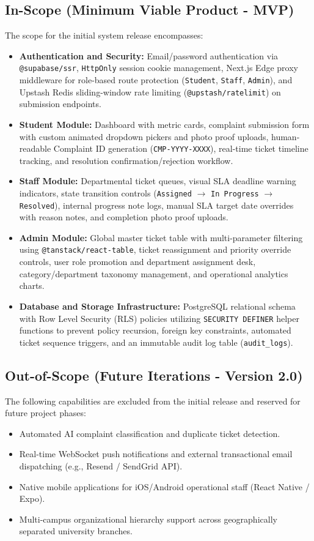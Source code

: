 \documentclass[12pt, a4paper]{article}
\begin{document}
\subsection{In-Scope (Minimum Viable Product - MVP)}
The scope for the initial system release encompasses:

\begin{itemize}
    \item \textbf{Authentication and Security:} Email/password authentication via \texttt{@supabase/ssr}, \texttt{HttpOnly} session cookie management, Next.js Edge proxy middleware for role-based route protection (\texttt{Student}, \texttt{Staff}, \texttt{Admin}), and Upstash Redis sliding-window rate limiting (\texttt{@upstash/ratelimit}) on submission endpoints.
    \item \textbf{Student Module:} Dashboard with metric cards, complaint submission form with custom animated dropdown pickers and photo proof uploads, human-readable Complaint ID generation (\texttt{CMP-YYYY-XXXX}), real-time ticket timeline tracking, and resolution confirmation/rejection workflow.
    \item \textbf{Staff Module:} Departmental ticket queues, visual SLA deadline warning indicators, state transition controls (\texttt{Assigned} $\rightarrow$ \texttt{In Progress} $\rightarrow$ \texttt{Resolved}), internal progress note logs, manual SLA target date overrides with reason notes, and completion photo proof uploads.
    \item \textbf{Admin Module:} Global master ticket table with multi-parameter filtering using \texttt{@tanstack/react-table}, ticket reassignment and priority override controls, user role promotion and department assignment desk, category/department taxonomy management, and operational analytics charts.
    \item \textbf{Database and Storage Infrastructure:} PostgreSQL relational schema with Row Level Security (RLS) policies utilizing \texttt{SECURITY DEFINER} helper functions to prevent policy recursion, foreign key constraints, automated ticket sequence triggers, and an immutable audit log table (\texttt{audit\_logs}).
\end{itemize}

\subsection{Out-of-Scope (Future Iterations - Version 2.0)}
The following capabilities are excluded from the initial release and reserved for future project phases:
\begin{itemize}
    \item Automated AI complaint classification and duplicate ticket detection.
    \item Real-time WebSocket push notifications and external transactional email dispatching (e.g., Resend / SendGrid API).
    \item Native mobile applications for iOS/Android operational staff (React Native / Expo).
    \item Multi-campus organizational hierarchy support across geographically separated university branches.
\end{itemize}
\end{document}
